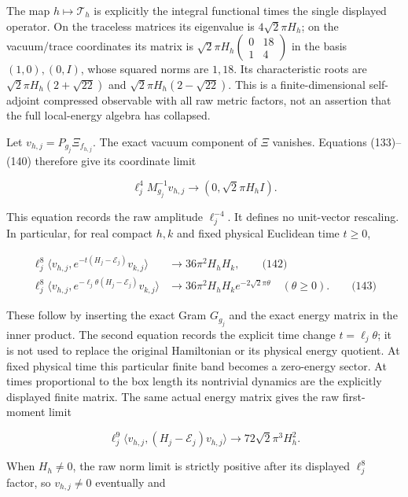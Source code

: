 The map \(h\mapsto\mathcal T_h\) is explicitly the integral functional
times the single displayed operator. On the traceless matrices its
eigenvalue is \(4\sqrt2\pi H_h\); on the vacuum/trace coordinates its
matrix is
\(\sqrt2\pi H_h\left(\begin{smallmatrix}0&18\\1&4\end{smallmatrix}\right)\)
in the basis \((1,0),(0,I)\), whose squared norms are \(1,18\). Its
characteristic roots are \(\sqrt2\pi H_h(2+\sqrt{22})\) and
\(\sqrt2\pi H_h(2-\sqrt{22})\). This is a finite-dimensional
self-adjoint compressed observable with all raw metric factors, not an
assertion that the full local-energy algebra has collapsed.

Let \(v_{h,j}=P_{g_j}\Xi_{f_{h,j}}\). The exact vacuum component of
\(\Xi\) vanishes. Equations (133)--(140) therefore give its coordinate
limit

\[
\ell_j^4M_{g_j}^{-1}v_{h,j}
 \longrightarrow(0,\sqrt2\pi H_hI).
\]

This equation records the raw amplitude \(\ell_j^{-4}\). It defines no
unit-vector rescaling. In particular, for real compact \(h,k\) and fixed
physical Euclidean time \(t\ge0\),

\[
\begin{aligned}
 \ell_j^8\langle v_{h,j},e^{-t(H_j-\mathcal E_j)}v_{k,j}\rangle
 &\longrightarrow36\pi^2H_hH_k,\qquad\text{(142)}\\
 \ell_j^8\langle v_{h,j},
       e^{-\ell_j\theta(H_j-\mathcal E_j)}v_{k,j}\rangle
 &\longrightarrow36\pi^2H_hH_k e^{-2\sqrt2\pi\theta}
 \quad(\theta\ge0).\qquad\text{(143)}
\end{aligned}
\]

These follow by inserting the exact Gram \(G_{g_j}\) and the exact
energy matrix in the inner product. The second equation records the
explicit time change \(t=\ell_j\theta\); it is not used to replace the
original Hamiltonian or its physical energy quotient. At fixed physical
time this particular finite band becomes a zero-energy sector. At times
proportional to the box length its nontrivial dynamics are the
explicitly displayed finite matrix. The same actual energy matrix gives
the raw first-moment limit

\[
\ell_j^9\langle v_{h,j},(H_j-\mathcal E_j)v_{h,j}\rangle
 \longrightarrow72\sqrt2\pi^3H_h^2.
\]

When \(H_h\ne0\), the raw norm limit is strictly positive after its
displayed \(\ell_j^8\) factor, so \(v_{h,j}\ne0\) eventually and


